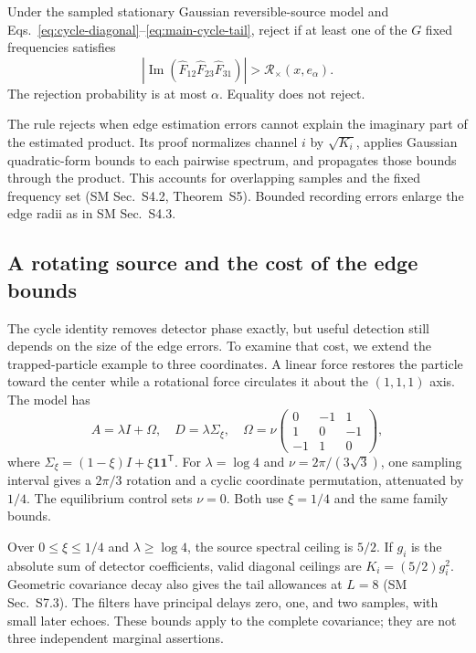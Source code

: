 \begin{theorem}\label{thm:main-cycle-test}
Under the sampled stationary Gaussian reversible-source model and Eqs.~\eqref{eq:cycle-diagonal}--\eqref{eq:main-cycle-tail}, reject if at least one of the $G$ fixed frequencies satisfies
\begin{equation}
 |\operatorname{Im}(\widehat F_{12}\widehat F_{23}\widehat F_{31})|
      >\mathcal R_\times(x,e_\alpha).\label{eq:main-cycle-test}
\end{equation}
The rejection probability is at most $\alpha$. Equality does not reject.
\end{theorem}

The rule rejects when edge estimation errors cannot explain the imaginary part of the estimated product. Its proof normalizes channel $i$ by $\sqrt{K_i}$, applies Gaussian quadratic-form bounds to each pairwise spectrum, and propagates those bounds through the product. This accounts for overlapping samples and the fixed frequency set (SM Sec.~S4.2, Theorem~S5). Bounded recording errors enlarge the edge radii as in SM Sec.~S4.3.



\subsection{A rotating source and the cost of the edge bounds}
The cycle identity removes detector phase exactly, but useful detection still depends on the size of the edge errors. To examine that cost, we extend the trapped-particle example to three coordinates. A linear force restores the particle toward the center while a rotational force circulates it about the $(1,1,1)$ axis. The model has
\begin{equation}
 A=\lambda I+\Omega,\quad D=\lambda\Sigma_\xi,\quad
 \Omega=\nu\begin{pmatrix}0&-1&1\\1&0&-1\\-1&1&0\end{pmatrix},
\end{equation}
where $\Sigma_\xi=(1-\xi)I+\xi\mathbf1\mathbf1^{\mathsf T}$. For $\lambda=\log4$ and $\nu=2\pi/(3\sqrt3)$, one sampling interval gives a $2\pi/3$ rotation and a cyclic coordinate permutation, attenuated by $1/4$. The equilibrium control sets $\nu=0$. Both use $\xi=1/4$ and the same family bounds.

Over $0\le\xi\le1/4$ and $\lambda\ge\log4$, the source spectral ceiling is $5/2$. If $g_i$ is the absolute sum of detector coefficients, valid diagonal ceilings are $K_i=(5/2)g_i^2$. Geometric covariance decay also gives the tail allowances at $L=8$ (SM Sec.~S7.3). The filters have principal delays zero, one, and two samples, with small later echoes. These bounds apply to the complete covariance; they are not three independent marginal assertions.

